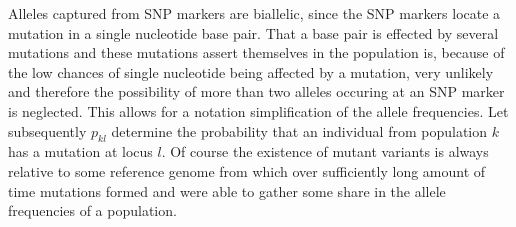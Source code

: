 \documentclass[a4paper, 11pt]{article}
\begin{document}

Alleles captured from SNP markers are biallelic, since the SNP markers locate a mutation in a single nucleotide base pair. That a base pair is effected by several mutations and these mutations assert themselves in the population is, because of the low chances of single nucleotide being affected by a mutation, very unlikely and therefore the possibility of more than two alleles occuring at an SNP marker is neglected. This allows for a notation simplification of the allele frequencies. Let subsequently  $p_{kl}$ determine the probability that an individual from population $k$ has a mutation at locus $l$. Of course the existence of mutant variants is always relative to some reference genome from which over sufficiently long amount of time mutations formed and were able to gather some share in the allele frequencies of a population.\\

\end{document}
